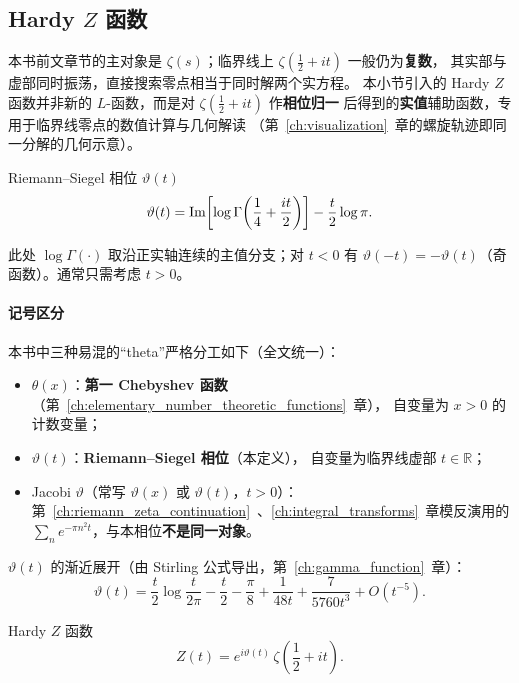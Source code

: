 \subsection{Hardy \texorpdfstring{$Z$}{Z} 函数}

本书前文章节的主对象是 $\zeta(s)$；临界线上 $\zeta(\frac12+it)$ 一般仍为\textbf{复数}，
其实部与虚部同时振荡，直接搜索零点相当于同时解两个实方程。
本小节引入的 Hardy $Z$ 函数并非新的 $L$-函数，而是对 $\zeta(\frac12+it)$ 作\textbf{相位归一}
后得到的\textbf{实值}辅助函数，专用于临界线零点的数值计算与几何解读
（第~\ref{ch:visualization}~章的螺旋轨迹即同一分解的几何示意）。

\begin{definition}{Riemann--Siegel 相位 $\vartheta(t)$}{}
\[
\vartheta(t)
=
\operatorname{Im}\!\left[\log\Gamma\!\left(\frac14+\frac{it}{2}\right)\right]
-
\frac{t}{2}\log\pi.
\]
\end{definition}

此处 $\log\Gamma(\cdot)$ 取沿正实轴连续的主值分支；对 $t<0$ 有
$\vartheta(-t)=-\vartheta(t)$（奇函数）。通常只需考虑 $t>0$。


\paragraph{记号区分}
本书中三种易混的“theta”严格分工如下（全文统一）：
\begin{itemize}
  \item $\theta(x)$：\textbf{第一 Chebyshev 函数}（第~\ref{ch:elementary_number_theoretic_functions}~章），
        自变量为 $x>0$ 的计数变量；
  \item $\vartheta(t)$：\textbf{Riemann--Siegel 相位}（本定义），
        自变量为临界线虚部 $t\in\mathbb{R}$；
  \item Jacobi $\vartheta$（常写 $\vartheta(x)$ 或 $\vartheta(t)$，$t>0$）：
        第~\ref{ch:riemann_zeta_continuation}~、\ref{ch:integral_transforms}~章模反演用的
        $\sum_n e^{-\pi n^2 t}$，与本相位\textbf{不是同一对象}。
\end{itemize}


$\vartheta(t)$ 的渐近展开（由 Stirling 公式导出，第~\ref{ch:gamma_function}~章）：
\begin{equation}
  \vartheta(t) = \frac{t}{2}\log\frac{t}{2\pi} - \frac{t}{2} - \frac{\pi}{8}
              + \frac{1}{48t} + \frac{7}{5760 t^3} + O(t^{-5}).
  \label{eq:theta_asymp}
\end{equation}

\begin{definition}{Hardy $Z$ 函数}{}
\[
Z(t) = e^{i\vartheta(t)}\,\zeta\!\left(\frac12+it\right).
\]
\end{definition}

